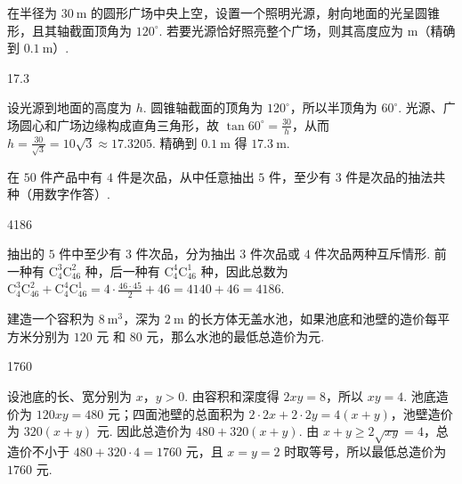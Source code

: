 \begin{problem}
在半径为 \(30\mathrm{~m}\) 的圆形广场中央上空，设置一个照明光源，射向地面的光呈圆锥形，且其轴截面顶角为 \(120^{\circ}\). 若要光源恰好照亮整个广场，则其高度应为\fillinblank{} \(\mathrm{m}\)（精确到 \(0.1\mathrm{~m}\)）.
\end{problem}

\begin{answer}
17.3
\end{answer}

\begin{solution}
设光源到地面的高度为 \(h\). 圆锥轴截面的顶角为 \(120^\circ\)，所以半顶角为 \(60^\circ\). 光源、广场圆心和广场边缘构成直角三角形，故 \(\displaystyle\tan60^\circ=\frac{30}{h}\)，从而 \(h=\frac{30}{\sqrt{3}}=10\sqrt{3}\approx17.3205\). 精确到 \(0.1\mathrm{~m}\) 得 \(17.3\mathrm{~m}\).
\end{solution}

\begin{problem}
在 \(50\) 件产品中有 \(4\) 件是次品，从中任意抽出 \(5\) 件，至少有 \(3\) 件是次品的抽法共\fillinblank{}\(\text{种}\)（用数字作答）.
\end{problem}

\begin{answer}
4186
\end{answer}

\begin{solution}
抽出的 \(5\) 件中至少有 \(3\) 件次品，分为抽出 \(3\) 件次品或 \(4\) 件次品两种互斥情形. 前一种有 \(\mathrm C_4^3\mathrm C_{46}^2\) 种，后一种有 \(\mathrm C_4^4\mathrm C_{46}^1\) 种，因此总数为 \(\displaystyle\mathrm C_4^3\mathrm C_{46}^2+\mathrm C_4^4\mathrm C_{46}^1=4\cdot\frac{46\cdot45}{2}+46=4140+46=4186\).
\end{solution}

\begin{problem}
建造一个容积为 \(8\mathrm{~m}^{3}\)，深为 \(2\mathrm{~m}\) 的长方体无盖水池，如果池底和池壁的造价每平方米分别为 \(120\text{ 元}\) 和 \(80\text{ 元}\)，那么水池的最低总造价为\fillinblank{}\(\text{元}\).
\end{problem}

\begin{answer}
1760
\end{answer}

\begin{solution}
设池底的长、宽分别为 \(x\)，\(y>0\). 由容积和深度得 \(2xy=8\)，所以 \(xy=4\). 池底造价为 \(120xy=480\) 元；四面池壁的总面积为 \(2\cdot2x+2\cdot2y=4(x+y)\)，池壁造价为 \(320(x+y)\) 元. 因此总造价为 \(480+320(x+y)\). 由 \(x+y\geqslant2\sqrt{xy}=4\)，总造价不小于 \(480+320\cdot4=1760\) 元，且 \(x=y=2\) 时取等号，所以最低总造价为 \(1760\) 元.
\end{solution}

